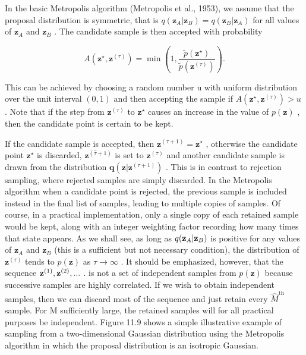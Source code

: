 \documentclass[
  10
]{article}
\begin{document}
In the basic Metropolis algorithm (Metropolis et al., 1953), we assume
that the proposal distribution is symmetric, that is
\(q ( \mathbf { z } _ { A } | \mathbf { z } _ { B } ) = q ( \mathbf { z } _ { B } | \mathbf { z } _ { A } )\)
for all values of \(\mathbf { z } _ { A }\) and
\(\mathbf { z } _ { B }\) . The candidate sample is then accepted with
probability

\[
A (\mathbf {z} ^ {\star}, \mathbf {z} ^ {(\tau)}) = \min \left(1, \frac {\widetilde {p} (\mathbf {z} ^ {\star})}{\widetilde {p} (\mathbf {z} ^ {(\tau)})}\right).\tag{11.33}
\]

This can be achieved by choosing a random number u with uniform
distribution over the unit interval \(( 0 , 1 )\) and then accepting the
sample if
\(A ( \mathbf { z } ^ { \star } , \mathbf { z } ^ { ( \tau ) } ) > u\) .
Note that if the step from \(\mathbf { z } ^ { ( \tau ) }\) to
\(\mathbf { z } ^ { \star }\) causes an increase in the value of
\(p ( \mathbf { z } )\) , then the candidate point is certain to be
kept.

If the candidate sample is accepted, then
\(\mathbf { z } ^ { ( \tau + 1 ) } = \mathbf { z } ^ { \star }\) ,
otherwise the candidate point \(\mathbf { z } ^ { \star }\) is
discarded, \(\mathbf { z } ^ { ( \hat { \tau } + 1 ) }\) is set to
\(\mathbf { z } ^ { ( \tau ) }\) and another candidate sample is drawn
from the distribution
\({ \boldsymbol { q } } ( \mathbf { z } | \mathbf { z } ^ { ( \tau + 1 ) } )\)
. This is in contrast to rejection sampling, where rejected samples are
simply discarded. In the Metropolis algorithm when a candidate point is
rejected, the previous sample is included instead in the final list of
samples, leading to multiple copies of samples. Of course, in a
practical implementation, only a single copy of each retained sample
would be kept, along with an integer weighting factor recording how many
times that state appears. As we shall see, as long as
\(q ( { \bf z } _ { A } | { \bf z } _ { B } )\) is positive for any
values of \(\mathbf { z } _ { A }\) and \(\mathbf { z } _ { B }\) (this
is a sufficient but not necessary condition), the distribution of
\(\mathbf { z } ^ { ( \tau ) }\) tends to \(p ( \mathbf { z } )\) as
\(\tau \to \infty\) . It should be emphasized, however, that the
sequence \({ \bf z } ^ { ( 1 ) } , { \bf z } ^ { ( 2 ) } , . . .\) . is
not a set of independent samples from \(p ( \mathbf { z } )\) because
successive samples are highly correlated. If we wish to obtain
independent samples, then we can discard most of the sequence and just
retain every \(\hat { M } ^ { \mathrm { t h } }\) sample. For M
sufficiently large, the retained samples will for all practical purposes
be independent. Figure 11.9 shows a simple illustrative example of
sampling from a two-dimensional Gaussian distribution using the
Metropolis algorithm in which the proposal distribution is an isotropic
Gaussian.
\end{document}
